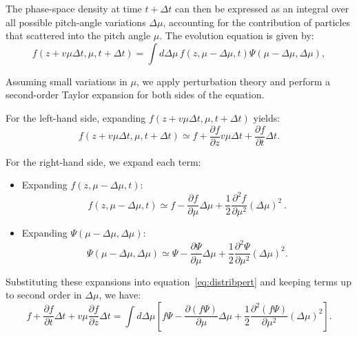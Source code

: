 The phase-space density at time \( t + \Delta t \) can then be expressed as an integral over all possible pitch-angle variations \( \Delta\mu \), accounting for the contribution of particles that scattered into the pitch angle \( \mu \). The evolution equation is given by:
\begin{equation}\label{eq:distribpert}
f(z + v\mu \Delta t, \mu, t + \Delta t) = \int d\Delta\mu \, f(z, \mu - \Delta\mu, t) \Psi(\mu - \Delta\mu, \Delta\mu),
\end{equation}

Assuming small variations in \( \mu \), we apply perturbation theory and perform a second-order Taylor expansion for both sides of the equation.

For the left-hand side, expanding \( f(z + v \mu \Delta t, \mu, t + \Delta t) \) yields:
\begin{equation}
f(z + v \mu \Delta t, \mu, t + \Delta t) \simeq f + \frac{\partial f}{\partial z} v \mu \Delta t + \frac{\partial f}{\partial t} \Delta t.
\end{equation}

For the right-hand side, we expand each term:
%
\begin{itemize}
\item Expanding \( f(z, \mu - \Delta \mu, t) \):
\begin{equation}
f(z, \mu - \Delta \mu, t) \simeq f - \frac{\partial f}{\partial \mu} \Delta \mu + \frac{1}{2} \frac{\partial^2 f}{\partial \mu^2} (\Delta \mu)^2~.
\end{equation}

\item Expanding \( \Psi(\mu - \Delta \mu, \Delta \mu) \):
\begin{equation}
\Psi(\mu - \Delta \mu, \Delta \mu) \simeq \Psi - \frac{\partial \Psi}{\partial \mu} \Delta \mu + \frac{1}{2} \frac{\partial^2 \Psi}{\partial \mu^2} (\Delta \mu)^2.
\end{equation}
\end{itemize}

Substituting these expansions into equation~\eqref{eq:distribpert} and keeping terms up to second order in \( \Delta \mu \), we have:
\begin{equation}
f + \frac{\partial f}{\partial t} \Delta t + v \mu \frac{\partial f}{\partial z} \Delta t = 
\int d\Delta \mu \left[ 
f \Psi 
- \frac{\partial (f \Psi)}{\partial \mu} \Delta \mu 
+ \frac{1}{2} \frac{\partial^2 (f \Psi)}{\partial \mu^2} (\Delta \mu)^2
\right].
\end{equation}

